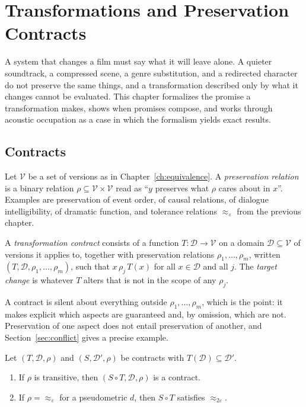 \chapter{Transformations and Preservation Contracts}
\label{ch:contracts}

A system that changes a film must say what it will leave alone. A quieter soundtrack, a compressed scene, a genre substitution, and a redirected character do not preserve the same things, and a transformation described only by what it changes cannot be evaluated. This chapter formalizes the promise a transformation makes, shows when promises compose, and works through acoustic occupation as a case in which the formalism yields exact results.

\section{Contracts}

Let $\mathcal{V}$ be a set of versions as in Chapter~\ref{ch:equivalence}. A \emph{preservation relation} is a binary relation $\rho\subseteq\mathcal{V}\times\mathcal{V}$ read as ``$y$ preserves what $\rho$ cares about in $x$''. Examples are preservation of event order, of causal relations, of dialogue intelligibility, of dramatic function, and tolerance relations $\approx_\varepsilon$ from the previous chapter.

\begin{definition}
A \emph{transformation contract} consists of a function $T:\mathcal{D}\to\mathcal{V}$ on a domain $\mathcal{D}\subseteq\mathcal{V}$ of versions it applies to, together with preservation relations $\rho_1,\dots,\rho_m$, written $(T,\mathcal{D},\rho_1,\dots,\rho_m)$, such that $x\,\rho_j\,T(x)$ for all $x\in\mathcal{D}$ and all $j$. The \emph{target change} is whatever $T$ alters that is not in the scope of any $\rho_j$.
\end{definition}

A contract is silent about everything outside $\rho_1,\dots,\rho_m$, which is the point: it makes explicit which aspects are guaranteed and, by omission, which are not. Preservation of one aspect does not entail preservation of another, and Section~\ref{sec:conflict} gives a precise example.

\begin{proposition}\label{prop:compose-contracts}
Let $(T,\mathcal{D},\rho)$ and $(S,\mathcal{D}',\rho)$ be contracts with $T(\mathcal{D})\subseteq\mathcal{D}'$.
\begin{enumerate}
\item If $\rho$ is transitive, then $(S\circ T,\mathcal{D},\rho)$ is a contract.
\item If $\rho=\approx_\varepsilon$ for a pseudometric $d$, then $S\circ T$ satisfies $\approx_{2\varepsilon}$.
\end{enumerate}
\end{proposition}

